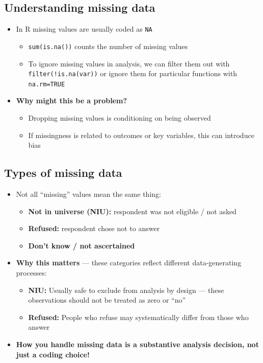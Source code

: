 \documentclass[
  letterpaper,
  DIV=11,
  numbers=noendperiod]{scrartcl}
\providecommand{\tightlist}{%
  \setlength{\itemsep}{0pt}\setlength{\parskip}{0pt}}
\begin{document}
\subsection{Understanding missing
data}\label{understanding-missing-data}

\begin{itemize}
\tightlist
\item
  In R missing values are usually coded as \texttt{NA}

  \begin{itemize}
  \tightlist
  \item
    \texttt{sum(is.na())} counts the number of missing values
  \item
    To ignore missing values in analysis, we can filter them out with
    \texttt{filter(!is.na(var))} or ignore them for particular functions
    with \texttt{na.rm=TRUE}
  \end{itemize}
\item
  \textbf{Why might this be a problem?}

  \begin{itemize}
  \tightlist
  \item
    Dropping missing values is conditioning on being observed
  \item
    If missingness is related to outcomes or key variables, this can
    introduce bias
  \end{itemize}
\end{itemize}

\subsection{Types of missing data}\label{types-of-missing-data}

\begin{itemize}
\tightlist
\item
  Not all ``missing'' values mean the same thing:

  \begin{itemize}
  \tightlist
  \item
    \textbf{Not in universe (NIU):} respondent was not eligible / not
    asked
  \item
    \textbf{Refused:} respondent chose not to answer
  \item
    \textbf{Don't know / not ascertained}
  \end{itemize}
\item
  \textbf{Why this matters} --- these categories reflect different
  data-generating processes:

  \begin{itemize}
  \tightlist
  \item
    \textbf{NIU:} Usually safe to exclude from analysis by design ---
    these observations should not be treated as zero or ``no''
  \item
    \textbf{Refused:} People who refuse may systematically differ from
    those who answer
  \end{itemize}
\item
  \textbf{How you handle missing data is a substantive analysis
  decision, not just a coding choice!}
\end{itemize}
\end{document}
